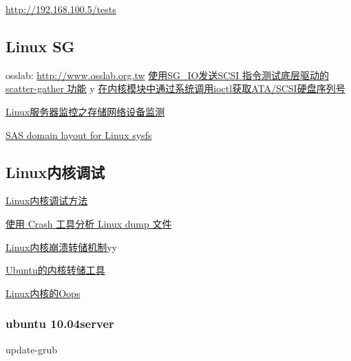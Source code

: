 \documentclass[11pt]{article}
\begin{document}
    \href{http://192.168.100.5/tests}{http://192.168.100.5/tests}


\subsection{Linux SG}
\label{sec-1.3}

osslab: \href{http://www.osslab.org.tw}{http://www.osslab.org.tw}
\href{http://hi.baidu.com/widebright/blog/item/e1278501f75ff3dd267fb57f.html}{使用SG\_IO发送SCSI 指令测试底层驱动的scatter-gather 功能}
y
\href{http://blog.csdn.net/force_eagle/archive/2010/04/20/5507606.aspx}{在内核模块中通过系统调用ioctl获取ATA/SCSI硬盘序列号}

\href{http://hi.baidu.com/suping/blog/item/db3d9513ad372e886538db1a.html}{Linux服务器监控之存储网络设备监测}

\href{http://search.luky.org/ML/linux-kernel.2005/msg29654.html}{SAS domain layout for Linux sysfs}


\subsection{Linux内核调试}
\label{sec-1.4}


\href{http://www.shangshuwu.cn/index.php/Linux%E5%86%85%E6%A0%B8%E8%B0%83%E8%AF%95%E6%96%B9%E6%B3%95}{Linux内核调试方法}

\href{http://www.cublog.cn/u1/56284/showart_2303524.html}{使用 Crash 工具分析 Linux dump 文件}

\href{http://www.xxlinux.com/linux/article/development/kernel/20100423/18211.html}{Linux内核崩溃转储机制}yy

\href{http://www.cnblogs.com/wwang/archive/2010/11/19/1881304.html}{Ubuntu的内核转储工具}

\href{http://www.cnblogs.com/wwang/archive/2010/11/14/1876735.html}{Linux内核的Oops}

\subsubsection{ubuntu 10.04server}
\label{sec-1.4.1}

update-grub
\end{document}
